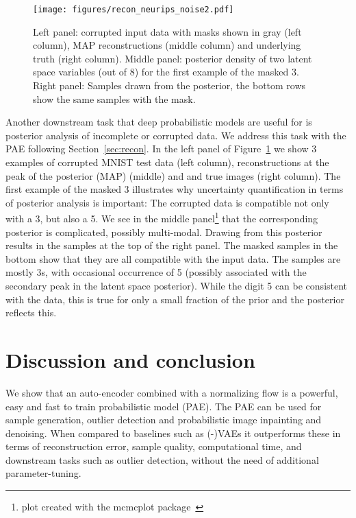 \documentclass{article}
\begin{document}
\begin{figure}
\begin{center}
\texttt{[image: figures/recon\_neurips\_noise2.pdf]}
\end{center}
\caption{Left panel: corrupted input data with masks shown in gray (left column), MAP 
reconstructions (middle column) and underlying truth (right column). Middle panel: posterior density of two latent space variables (out of 8) for the first example of the masked 3. Right panel: Samples drawn from the posterior, the bottom rows show the same samples with the mask.}
\label{fig:inpainting}
\end{figure}


Another downstream task that deep probabilistic 
models are useful for is posterior analysis of incomplete or 
corrupted data. We address this task with the PAE following Section~\ref{sec:recon}. In the left panel of Figure~\ref{fig:inpainting} we show 3 examples of corrupted MNIST test data (left column), reconstructions at the peak of the posterior (MAP) (middle) and and true images (right column). The first example of the masked 3 illustrates why uncertainty quantification in terms of posterior analysis is important: The corrupted data is compatible not only with a 3, but also a 5. We see in the middle panel\footnote{plot created with the mcmcplot package~\citep{mcmcplot}} that the corresponding posterior is 
complicated, possibly multi-modal. Drawing from this posterior results in the 
samples at the top of the right panel. The masked samples in the bottom show that they are all compatible with the input data. The samples are mostly 3s, 
with occasional occurrence of 5 (possibly associated 
with the secondary peak in the latent space
posterior). While the digit 5 can be consistent with the 
data, this is true for only a small fraction of the prior and the posterior reflects this. \section{Discussion and conclusion}
We show that an auto-encoder combined with a normalizing 
flow is a powerful, easy and fast to train probabilistic model (PAE). The PAE can be used for sample generation, outlier detection and probabilistic image inpainting and denoising. When compared to baselines such as (-)VAEs it outperforms these in terms of reconstruction error, sample quality, computational time, and downstream tasks such as outlier detection, without the need of additional parameter-tuning. 
\end{document}
